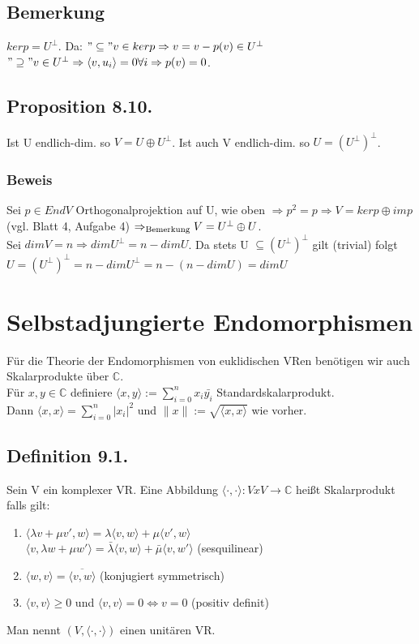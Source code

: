 \documentclass[a4paper, 12pt]{extarticle}
\newcommand{\norm}[1]{
	\parallel #1 \parallel
}
\newcommand{\skalar}[2] {
	\langle #1, #2\rangle
}
\newcommand{\genskalar}{
	\skalar{\cdot }{\cdot }
}
\newcommand{\gdw}{\Leftrightarrow}
\newcommand{\tn}[1]{\textnormal {#1}}
\begin{document}
\subsection*{Bemerkung}
$ker p = U^\perp$. Da: $"\subseteq" v\in kerp \Rightarrow v=v-p(v)\in U^\perp$ \\
$"\supseteq" v \in U^\perp \Rightarrow \skalar{v}{u_i} = 0\forall i \Rightarrow p(v)=0$.
\subsection*{Proposition 8.10.}
Ist U endlich-dim. so $V=U\oplus U^\perp$.
Ist auch V endlich-dim. so $U = (U^\perp)^\perp$.
\subsubsection{Beweis}
Sei $p\in EndV$ Orthogonalprojektion auf U, wie oben $\Rightarrow p^2=p \Rightarrow V=ker p \oplus im p$ (vgl. Blatt 4, Aufgabe 4) $\Rightarrow_{\tn{Bemerkung}} V = U^\perp \oplus U$. \\
Sei $dimV = n \Rightarrow dim U^\perp = n - dim U$.
Da stets U $\subseteq (U^\perp)^\perp$ gilt (trivial) folgt $U = (U^\perp)^\perp = n- dim U^\perp = n - (n- dimU) = dim U$ 
\section{Selbstadjungierte Endomorphismen}
Für die Theorie der Endomorphismen von euklidischen VRen benötigen wir auch Skalarprodukte über $\mathbb C$. \\
Für $x,y\in \mathbb C$ definiere $\skalar{x}{y}:= \sum_{i=0}^{n}x_i\bar{y_i}$ Standardskalarprodukt. \\
Dann $\skalar{x}{x} = \sum_{i=0}^{n}|x_i|^2$ und $\norm{x} := \sqrt{\skalar{x}{x}}$ wie vorher.
\subsection*{Definition 9.1.}
Sein V ein komplexer VR. Eine Abbildung $\genskalar:VxV\to \mathbb C$ heißt Skalarprodukt falls gilt: \\
\begin{enumerate}[start=1,label={(\bfseries S\arabic*)':}]
	\item $\skalar{\lambda v+\mu v'}{w} = \lambda\skalar{v}{w} + \mu \skalar{v'}{w}$ \\
 	$\skalar{v}{\lambda w+\mu w'} = \bar\lambda\skalar{v}{w} + \bar\mu\skalar{v}{w'}$ (sesquilinear)
	\item $\skalar{w}{v}=\overline{\skalar{v}{w}}$ (konjugiert symmetrisch)
	\item $\skalar{v}{v} \geq 0$ und $\skalar{v}{v} = 0 \gdw v = 0$ (positiv definit)
\end{enumerate}
Man nennt $(V,\genskalar)$ einen unitären VR.
\end{document}
